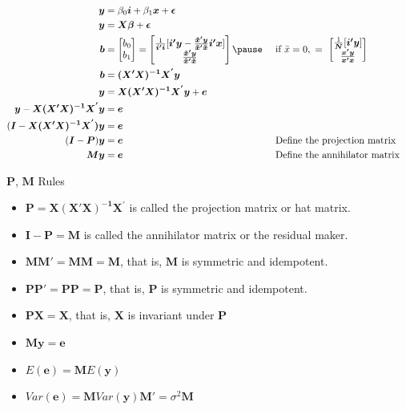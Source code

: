 \documentclass[aspectratio=169, handout]{beamer}
\numberwithin{equation}{section}
\begin{document}
\begin{frame}

\begin{align*}
\bm{y}&=\beta_0\bm{i}+\beta_1\bm{x}+\bm{\epsilon}\\
\bm{y}&=\bm{X}\bm{\beta}+\bm{\epsilon}\\
\bm{b}&=\begin{bmatrix}b_0 \\ b_1\end{bmatrix}=\begin{bmatrix}\frac{1}{\bm{i'i}}[\bm{i'}\bm{y}-\frac{\bm{\tilde{x}'y}}{\bm{\tilde{x}'\tilde{x}}}\bm{i'}\bm{x}]\\ \frac{\bm{\tilde{x}'y}}{\bm{\tilde{x}'\tilde{x}}} \end{bmatrix}\pause &&\text{ if }\bar{x}=0,\ =\ \begin{bmatrix}\frac{1}{\bm{N}}[\bm{i'}\bm{y}]\\ \frac{\bm{x'y}}{\bm{x'x}} \end{bmatrix}\\
\bm{b}&=\bm{(X'X)^{-1}}\bm{X^{'}y}\\
\bm{y}&=\bm{X}\bm{(X'X)^{-1}}\bm{X^{'}y}+\bm{e}\\
\bm{y}-\bm{X}\bm{(X'X)^{-1}}\bm{X^{'}y}&=\bm{e}\\
(\bm{I}-\bm{X}\bm{(X'X)^{-1}}\bm{X^{'})y}&=\bm{e}\\
(\bm{I}-\bm{P})\bm{y}&= \bm{e} &&\text{ Define the projection matrix}\\
\bm{My}&= \bm{e}&&\text{ Define the annihilator matrix}
\end{align*}
\end{frame}


\begin{frame}{$\bm{P}$, $\bm{M}$ Rules}
\begin{itemize}
\item $\bm{P}=\bm{X}\bm{(X'X)^{-1}}\bm{X^{'}}$ is called the projection matrix or hat matrix.
\item $\bm{I}-\bm{P}=\bm{M}$ is called the annihilator matrix or the residual maker.
\item $\bm{MM'}=\bm{MM}=\bm{M}$, that is, $\bm{M}$ is symmetric and idempotent. 
\item $\bm{PP'}=\bm{PP}=\bm{P}$, that is, $\bm{P}$ is  symmetric and idempotent. 
\item $\bm{PX}=\bm{X}$, that is, $\bm{X}$ is invariant under $\bm{P}$
\item $\bm{My}=\bm{e}$
\item $E(\bm{e})=\bm{M}E(\bm{y})$
\item $Var(\bm{e})=\bm{M}Var(\bm{y})\bm{M'}=\sigma^2\bm{M}$
\end{itemize}

\end{frame}
\end{document}
